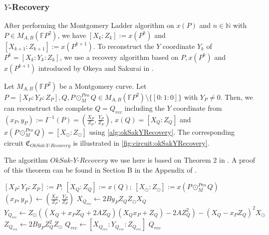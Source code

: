 \newpage
\phantom{bla}
\newpage
\subsubsection{$Y$-Recovery}
After performing the Montgomery Ladder algorithm on $x(P)$ and $n\in\mathbb{N}$ with $P\in M_{A,B}(\mathbb{F}P^2)$, we have $[X_k:Z_k]:=x(P^k)$ and $[X_{k+1}:Z_{k+1}]:=x(P^{k+1})$.
To reconstruct the $Y$ coordinate $Y_k$ of $P^{k}=[X_k:Y_k:Z_k]$, we use a recovery algorithm based on $P, x(P^k)$ and $x(P^{k+1})$ introduced by Okeya and Sakurai in \cite{goos_efficient_2001}.

\begin{theorem}
    Let $M_{A,B}(\mathbb{F}P^2)$ be a Montgomery curve.
    Let $P=[X_P:Y_P:Z_P], Q, P\odot_{M}^{Pro}Q\in M_{A,B}(\mathbb{F}P^2)\setminus\{[0:1:0]\}$ with $Y_P\neq 0$.
    Then, we can reconstruct the complete $Q=Q_{rec}$ including the $Y$ coordinate from $(x_P, y_P):=I^{-1}(P)=\left(\frac{X_P}{Z_P}, \frac{Y_P}{Z_P}\right)$, $x(Q)=[X_Q:Z_Q]$ and $x(P\odot_M^{Pro} Q)=[X_\odot:Z_\odot]$ using \cref{alg:okSakYRecovery}.
    The corresponding circuit $\mathfrak{C}_{OkSak\text{-}Y\text{-}Recovery}$ is illustrated in \cref{fig:circuit:okSakYRecovery}.
\end{theorem}

The algorithm $OkSak\text{-}Y\text{-}Recovery$ we use here is based on Theorem 2 in \cite{goos_efficient_2001}. 
A proof of this theorem can be found in Section B in the Appendix of \cite{goos_efficient_2001}.

\begin{Algorithmus}[h] %
    \caption{Okeya-Sakurai $Y$-Recovery used to recover $Q$ with $Y$ coordinate from $P$, $x(Q)$ and $x(P\odot_M^{Pro} Q)$.
    Here, $P=[X_P:Y_P:Z_P],P\odot_{M}^{Pro}Q\in M_{A,B}(\mathbb{F}P^2)\setminus\{[0:1:0]\}$, with $Y_P\neq 0$.}
    \label{alg:okSakYRecovery}
    \begin{algorithmic}
        \State $[X_P:Y_P:Z_P]:=P;\: [X_Q:Z_Q]:=x(Q);\: [X_\odot:Z_\odot]:=x(P\odot_M^{Pro}Q)$
        \State $(x_P, y_P)\gets \left(\frac{X_P}{Z_P}, \frac{Y_P}{Z_P}\right)$
        \State $X_{Q_{rec}}\gets 2By_PZ_QZ_\odot X_Q$
        \State $Y_{Q_{rec}}\gets Z_\odot((X_Q+x_PZ_Q+2AZ_Q)(X_Qx_P+Z_Q)-2AZ_Q^2)-(X_Q-x_PZ_Q)^2X_\odot$
        \State $Z_{Q_{rec}}\gets 2By_PZ_Q^2Z_\odot$
        \State $Q_{rec} \gets  [X_{Q_{rec}}:Y_{Q_{rec}}:Z_{Q_{rec}}]$
        \State \Return $Q_{rec}$
    \EndProcedure
    \end{algorithmic}
\end{Algorithmus}

